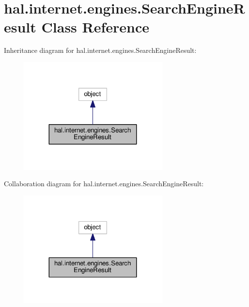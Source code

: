 \hypertarget{classhal_1_1internet_1_1engines_1_1_search_engine_result}{}\section{hal.\+internet.\+engines.\+Search\+Engine\+Result Class Reference}
\label{classhal_1_1internet_1_1engines_1_1_search_engine_result}


Inheritance diagram for hal.\+internet.\+engines.\+Search\+Engine\+Result\+:
\nopagebreak
\begin{figure}[H]
\begin{center}
\leavevmode
\includegraphics[width=215pt]{classhal_1_1internet_1_1engines_1_1_search_engine_result__inherit__graph}
\end{center}
\end{figure}


Collaboration diagram for hal.\+internet.\+engines.\+Search\+Engine\+Result\+:
\nopagebreak
\begin{figure}[H]
\begin{center}
\leavevmode
\includegraphics[width=215pt]{classhal_1_1internet_1_1engines_1_1_search_engine_result__coll__graph}
\end{center}
\end{figure}
